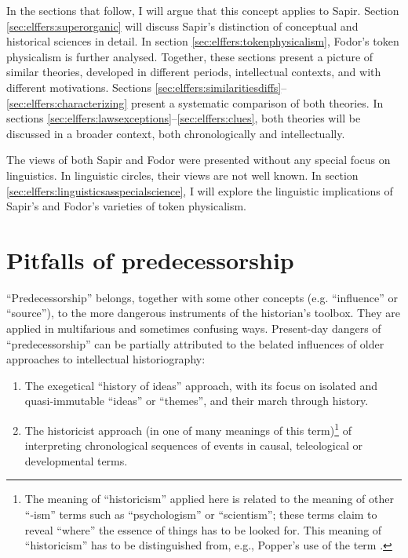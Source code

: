 \documentclass[output=paper]{langscibook}
\begin{document}
In the sections that follow, I will argue that this concept applies to Sapir. Section \ref{sec:elffers:superorganic} will discuss Sapir's distinction of conceptual and historical sciences in detail. In section \ref{sec:elffers:tokenphysicalism}, Fodor's token physicalism is further analysed. Together, these sections present a picture of similar theories, developed in different periods, intellectual contexts, and with different motivations. Sections \ref{sec:elffers:similaritiesdiffs}–\ref{sec:elffers:characterizing} present a systematic comparison of both theories. In sections \ref{sec:elffers:lawsexceptions}–\ref{sec:elffers:clues}, both theories will be discussed in a broader context, both chronologically and intellectually. 

The views of both Sapir and Fodor were presented without any special focus on linguistics. In linguistic circles, their views are not well known. In section \ref{sec:elffers:linguisticsasspecialscience}, I will explore the linguistic implications of Sapir's and Fodor's varieties of token physicalism.

\section{Pitfalls of predecessorship}
\label{sec:elffers:pitfalls}

``Predecessorship'' belongs, together with some other concepts (e.g. ``influence'' or ``source''), to the more dangerous instruments of the historian's toolbox. They are applied in multifarious and sometimes confusing ways. Present-day dangers of ``predecessorship'' can be partially attributed to the belated influences of older approaches to intellectual historiography:

\begin{enumerate}
    \item The exegetical ``history of ideas'' approach, with its focus on isolated and quasi-immutable ``ideas'' or ``themes'', and their march through history.
    \item The historicist approach (in one of many meanings of this term)\footnote{The meaning of ``historicism'' applied here is related to the meaning of other ``-ism'' terms such as ``psychologism'' or ``scientism''; these terms claim to reveal ``where'' the essence of things has to be looked for. This meaning of ``historicism'' has to be distinguished from, e.g., Popper's use of the term \citep[cf.][43]{Elffers1991}.} of interpreting chronological sequences of events in causal, teleological or developmental terms.
\end{enumerate}
\end{document}
